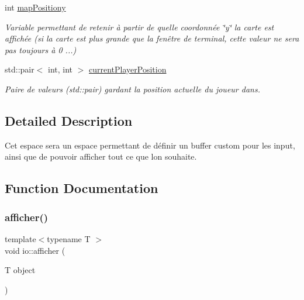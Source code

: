 \begin{DoxyCompactItemize}
\mbox{\label{namespaceio_aa0322ffa705df7bd3c4fa5eaefde5d6d}} 
int \hyperlink{namespaceio_aa0322ffa705df7bd3c4fa5eaefde5d6d}{map\+Positiony}
\begin{DoxyCompactList}\small\item\em Variable permettant de retenir à partir de quelle coordonnée \char`\"{}y\char`\"{} la carte est affichée (si la carte est plus grande que la fenêtre de terminal, cette valeur ne sera pas toujours à 0 ...) \end{DoxyCompactList}\item 
\mbox{\label{namespaceio_a2a0c75ff7760b96fcf6e696efe3d1c51}} 
std\+::pair$<$ int, int $>$ \hyperlink{namespaceio_a2a0c75ff7760b96fcf6e696efe3d1c51}{current\+Player\+Position}
\begin{DoxyCompactList}\small\item\em Paire de valeurs (std\+::pair) gardant la position actuelle du joueur dans. \end{DoxyCompactList}\end{DoxyCompactItemize}


\subsection{Detailed Description}
Cet espace sera un espace permettant de définir un buffer custom pour les input, ainsi que de pouvoir afficher tout ce que l\textquotesingle{}on souhaite. 

\subsection{Function Documentation}
\mbox{\label{namespaceio_ac5222293c3d12f7982a8df7ead04ba0b}} 
\subsubsection{\texorpdfstring{afficher()}{afficher()}}
{\footnotesize\ttfamily template$<$typename T $>$ \\
void io\+::afficher (\begin{DoxyParamCaption}\item[{T}]{object }\end{DoxyParamCaption})}



